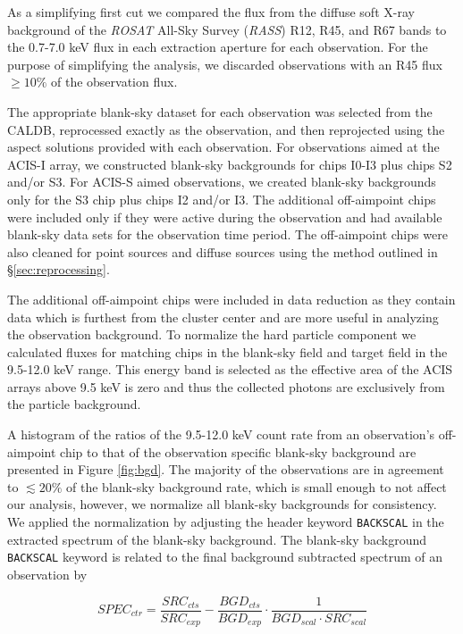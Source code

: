 \documentclass{emulateapj}
\begin{document}
As a simplifying first cut we compared the flux from the diffuse soft X-ray
background of the {\textit{ROSAT}} All-Sky
Survey ({\textit{RASS}}) R12, R45, and R67 bands to the 0.7-7.0 keV flux in
each extraction aperture for each observation. For the purpose
of simplifying the analysis, we discarded observations with
an R45 flux $\geq 10\%$ of the observation flux.

The appropriate blank-sky dataset for each observation was
selected from the CALDB, reprocessed exactly as the
observation, and then reprojected using the aspect solutions provided
with each observation. For observations aimed at the ACIS-I array, we
constructed blank-sky backgrounds for chips I0-I3 plus chips S2 and/or S3.
For ACIS-S aimed observations, we created blank-sky backgrounds only for the S3
chip plus chips I2 and/or I3. The additional off-aimpoint chips were
included only if they were active during the observation and had
available blank-sky data sets for the observation time period. The
off-aimpoint chips were also cleaned for point sources and diffuse
sources using the method outlined in \S\ref{sec:reprocessing}.

The additional off-aimpoint chips were included in data reduction as
they contain data which is furthest from the cluster center and are
more useful in analyzing the observation background. To normalize the
hard particle component we calculated fluxes for matching chips
in the blank-sky field and target field in the 9.5-12.0 keV
range. This energy band is selected as the effective area of the ACIS
arrays above 9.5 keV is zero and thus the collected photons are
exclusively from the particle background.

A histogram of the ratios of the 9.5-12.0 keV count rate from an
observation's off-aimpoint chip to that of the observation specific
blank-sky background are presented in Figure \ref{fig:bgd}. The
majority of the observations are in agreement to $\lesssim 20\%$ of
the blank-sky background rate, which is small enough to not affect our
analysis, however, we normalize all blank-sky backgrounds for consistency. We
applied the normalization by adjusting the header keyword {\tt BACKSCAL}
in the extracted spectrum of the blank-sky background. The blank-sky
background {\tt BACKSCAL} keyword is related to the final background
subtracted spectrum of an observation by

\begin{equation}
SPEC_{ctr} = \frac{SRC_{cts}}{SRC_{exp}} -
\frac{BGD_{cts}}{BGD_{exp}} \cdot \frac{1}{BGD_{scal} \cdot
SRC_{scal}}
\end{equation}
\end{document}
